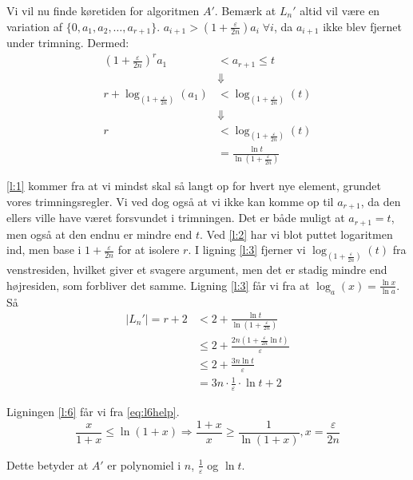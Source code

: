 Vi vil nu finde køretiden for algoritmen $A'$. Bemærk at $L_{n}'$ altid vil være en variation af $\{0, a_{1}, a_{2}, \ldots, a_{r+1}\}$. $a_{i+1} > \left( 1+ \frac{\varepsilon}{2n} \right)a_{i} \; \forall i$, da $a_{i+1}$ ikke blev fjernet under trimning. Dermed:
\begin{align}
  \left( 1+ \frac{\varepsilon}{2n} \right)^{r} a_{1} &< a_{r+1} \le t \label{l:1}\\
  &\Downarrow\\
  r + \log_{(1+\frac{\varepsilon}{2n})}(a_{1}) &< \log_{\left( 1+ \frac{\varepsilon}{2n} \right)} (t) \label{l:2}\\
  &\Downarrow\\
 r &< \log_{\left( 1 + \frac{\varepsilon}{2n} \right)}  (t) \label{l:3}\\
  &= \frac{\ln t}{\ln \left( 1 + \frac{\varepsilon}{2n} \right) \label{l:4}}
\end{align}

\eqref{l:1} kommer fra at vi mindst skal så langt op for hvert nye element, grundet vores trimningsregler. Vi ved dog også at vi ikke kan komme op til $a_{r+1}$, da den ellers ville have været forsvundet i trimningen. Det er både muligt at $a_{r+1} = t$, men også at den endnu er mindre end $t$. Ved \eqref{l:2} har vi blot puttet logaritmen ind, men base i $1 + \frac{\varepsilon}{2n}$ for at isolere $r$. I ligning \eqref{l:3} fjerner vi $\log_{\left( 1+ \frac{\varepsilon}{2n} \right)}(t)$ fra venstresiden, hvilket giver et svagere argument, men det er stadig mindre end højresiden, som forbliver det samme. Ligning \eqref{l:3} får vi fra at $\log_{a}(x) = \frac{\ln x}{\ln a}$. Så
\begin{align}
  |L_{n}'| = r+2 &< 2 + \frac{\ln t}{\ln (1 + \frac{\varepsilon}{2n})} \label{l:5}\\
 & \le 2 + \frac{2n ( 1 + \frac{\varepsilon}{2n} \ln t)}{\varepsilon} \label{l:6}\\
 & \le 2 + \frac{3n \ln t}{\varepsilon} \label{l:7}\\
 & = 3n \cdot \frac{1}{\varepsilon} \cdot \ln t + 2 \label{l:8}
\end{align}

Ligningen \eqref{l:6} får vi fra \eqref{eq:l6help}.
\begin{equation}
  \label{eq:l6help}
\frac{x}{1+x} \le \ln (1+x) \Rightarrow \frac{1+x}{x} \ge \frac{1}{\ln (1+x)}, x = \frac{\varepsilon}{2n}
\end{equation}

Dette betyder at $A'$ er polynomiel i $n$, $\frac{1}{\varepsilon}$ og $\ln t$.





